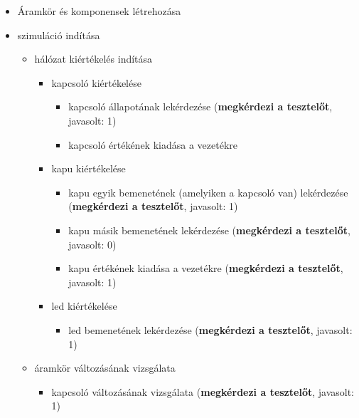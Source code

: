 {\vspace{-15pt}
\begin{itemize}
\setlength{\itemsep}{0cm}%
\setlength{\parskip}{0cm}%
\setlength{\itemindent}{-15pt}%
\item Áramkör és komponensek létrehozása
\item szimuláció indítása
\begin{itemize}
\setlength{\itemsep}{0cm}%
\setlength{\parskip}{0cm}%
\setlength{\itemindent}{-35pt}%
\item hálózat kiértékelés indítása
\begin{itemize}
\setlength{\itemsep}{0cm}%
\setlength{\parskip}{0cm}%
\setlength{\itemindent}{-50pt}%
	\item kapcsoló kiértékelése
	\begin{itemize}
	\setlength{\itemsep}{0cm}%
	\setlength{\parskip}{0cm}%
	\setlength{\itemindent}{-65pt}%
		\item kapcsoló állapotának lekérdezése (\textbf{megkérdezi a tesztelőt}, javasolt: 1)
		\item kapcsoló értékének kiadása a vezetékre
	\end{itemize}
	\item kapu kiértékelése
	\begin{itemize}
	\setlength{\itemsep}{0cm}%
	\setlength{\parskip}{0cm}%
	\setlength{\itemindent}{-65pt}%
		\item kapu egyik bemenetének (amelyiken a kapcsoló van) lekérdezése (\textbf{megkérdezi a tesztelőt}, javasolt: 1)
		\item kapu másik bemenetének lekérdezése (\textbf{megkérdezi a tesztelőt}, javasolt: 0)
		\item kapu értékének kiadása a vezetékre (\textbf{megkérdezi a tesztelőt}, javasolt: 1)
	\end{itemize}
	\item led kiértékelése
	\begin{itemize}
	\setlength{\itemsep}{0cm}%
	\setlength{\parskip}{0cm}%
	\setlength{\itemindent}{-65pt}%
		\item led bemenetének lekérdezése (\textbf{megkérdezi a tesztelőt}, javasolt: 1)
	\end{itemize}
\end{itemize}
\item áramkör változásának vizsgálata
\begin{itemize}
\setlength{\itemsep}{0cm}%
\setlength{\parskip}{0cm}%
\setlength{\itemindent}{-50pt}%
	\item kapcsoló változásának vizsgálata (\textbf{megkérdezi a tesztelőt}, javasolt: 1)

\end{itemize}
\end{itemize}
\end{itemize}}
